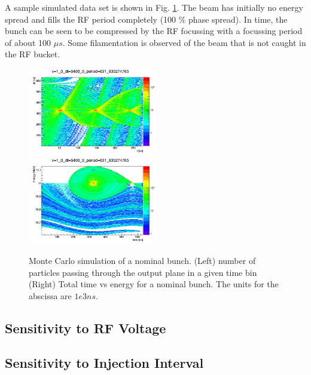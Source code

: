 \documentclass{paper}
\begin{document}
A sample simulated data set is shown in Fig. \ref{fig:nominal_mc}. The beam has
initially no energy spread and fills the RF period completely (100 $\%$ phase
spread). In time, the bunch can be seen to be compressed by the RF focussing with
a focussing period of about 100 $\mu s$. Some filamentation is observed of the
beam that is not caught in the RF bucket.

\begin{figure}
		\includegraphics[width=0.5\textwidth]{images/time_vs_dt_v=1_0_dt=6400_0_period=631_833274765}
		\includegraphics[width=0.5\textwidth]{images/time_vs_energy_v=1_0_dt=6400_0_period=631_833274765}
	\caption{Monte Carlo simulation of a nominal bunch. (Left) number of particles
           passing through the output plane in a given time bin (Right) Total 
           time vs energy for a nominal bunch. The units for the abscissa are
           $1e3 ns$.}
	\label{fig:nominal_mc}
\end{figure}

\subsection{Sensitivity to RF Voltage}


\subsection{Sensitivity to Injection Interval}
\end{document}
